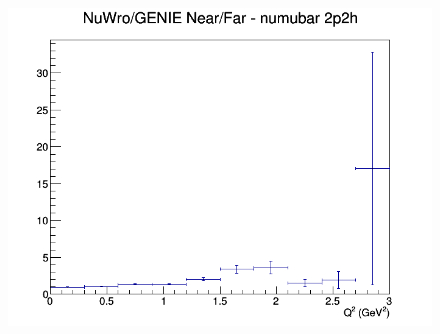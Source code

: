 \begin{figure}[h]
\endminipage
{}
\includegraphics[width=\linewidth]{eff_Q2/LAr/ratios/2p2h_NuWro_GENIE_numubar_NF_Q2.png}
\endminipage
\newline
\end{figure}
\clearpage
